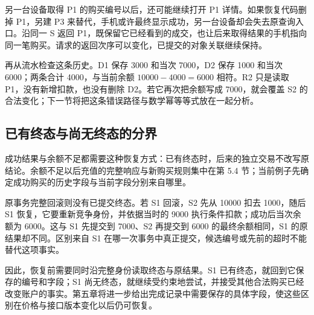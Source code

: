 另一台设备取得 P1 的购买编号以后，还可能继续打开 P1 详情。如果恢复代码删掉 P1，另建 P3 来替代，手机或许最终显示成功，另一台设备却会失去原查询入口。沿同一 S 返回 P1，既保留它已经看到的成交，也让后来取得结果的手机指向同一笔购买。请求的返回次序可以变化，已提交的对象关联继续保持。

再从流水检查这条历史。D1 保存 3000 和当次 7000，D2 保存 1000 和当次 6000；两条合计 4000，与当前余额 \(10000-4000=6000\) 相符。R2 只是读取 P1，没有新增扣款，也没有删除 D2。若它再次把余额写成 7000，就会覆盖 S2 的合法变化；下一节将把这条错误路径与数学幂等等式放在一起分析。

\subsection*{已有终态与尚无终态的分界}

成功结果与余额不足都需要这种恢复方式：已有终态时，后来的独立交易不改写原结论。余额不足以后充值的完整响应与新购买规则集中在第 5.4 节；当前例子先确定成功购买的历史字段与当前字段分别来自哪里。

原事务完整回滚则没有已提交终态。若 S1 回滚，S2 先从 10000 扣去 1000，随后 S1 恢复，它要重新竞争身份，并依据当时的 9000 执行条件扣款；成功后当次余额为 6000。这与 S1 先提交到 7000、S2 再提交到 6000 的最终余额相同，S1 的原结果却不同。区别来自 S1 在哪一次事务中真正提交，候选编号或先前的超时不能替代这项事实。

因此，恢复前需要同时沿完整身份读取终态与原结果。S1 已有终态，就回到它保存的编号和字段；S1 尚无终态，就继续受约束地尝试，并接受其他合法购买已经改变账户的事实。第五章将进一步给出完成记录中需要保存的具体字段，使这些区别在价格与接口版本变化以后仍可恢复。
\FloatBarrier
